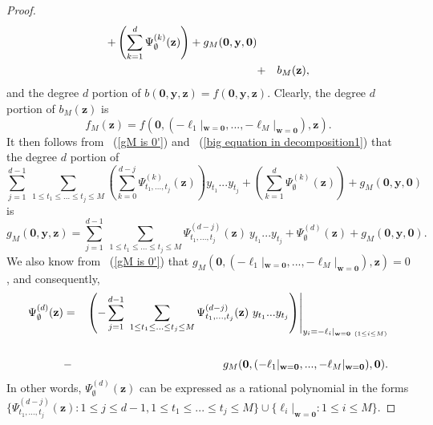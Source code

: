 \documentclass[12pt]{amsart}
\theoremstyle{definition}
\theoremstyle{remark}
\numberwithin{equation}{section}
\begin{document}
\begin{proof}
\begin{eqnarray}
+ \left( \sum_{k=1}^{d} \Psi^{(k)}_{\emptyset} ( \mathbf{z} ) \right) + g_M( \mathbf{0}, \mathbf{y}, \mathbf{0} )
\notag
\\
&+& b_M(\mathbf{z}),
\notag
\end{eqnarray}
and the degree $d$ portion of $b( \mathbf{0}, \mathbf{y}, \mathbf{z}) = f( \mathbf{0}, \mathbf{y}, \mathbf{z})$.
Clearly, the degree $d$ portion of $b_M(\mathbf{z})$ is
$$
f_M(\mathbf{z}) = {f} (\mathbf{0}, (- \ell_1 |_{\mathbf{w} = \mathbf{0}}, ..., -\ell_M |_{\mathbf{w} = \mathbf{0}}),  \mathbf{z}).
$$
It then follows from ~(\ref{gM is 0'}) and ~(\ref{big equation in decomposition1}) that the degree $d$ portion of
$$
\sum_{j=1}^{d-1} \ \sum_{1 \leq t_1 \leq ... \leq t_{j} \leq M}
\left( \sum_{k=0}^{d-j} \Psi^{(k)}_{t_1, ..., t_{j}} ( \mathbf{z} )  \right) y_{t_1} ... y_{t_{j}}
+ \left( \sum_{k=1}^{d} \Psi^{(k)}_{\emptyset} ( \mathbf{z} ) \right)
+ g_M( \mathbf{0}, \mathbf{y}, \mathbf{0} )
$$
is
$$
g_M( \mathbf{0}, \mathbf{y}, \mathbf{z} ) =  \sum_{j=1}^{d-1} \ \sum_{1 \leq t_1 \leq ... \leq t_{j} \leq M}
 \Psi^{(d-j)}_{t_1, ..., t_{j}} ( \mathbf{z} ) \ y_{t_1} ... y_{t_{j}}
+ \Psi^{(d)}_{\emptyset} ( \mathbf{z} )
+ g_M( \mathbf{0}, \mathbf{y}, \mathbf{0} ).
$$
We also know from ~(\ref{gM is 0'}) that $g_M( \mathbf{0}, (- \ell_1 |_{\mathbf{w} = \mathbf{0}}, ..., -\ell_M |_{\mathbf{w} = \mathbf{0}}), \mathbf{z} ) = 0$,
and consequently,
\begin{eqnarray}
\Psi^{(d)}_{\emptyset} ( \mathbf{z} )
&=&
 \left. \left( -\sum_{j=1}^{d-1} \ \sum_{1 \leq t_1 \leq ... \leq t_{j} \leq M} \Psi^{(d-j)}_{t_1, ..., t_{j}} ( \mathbf{z} ) \ y_{t_1} ... y_{t_{j}}
\right) \right|_{y_i = - \ell_i |_{\mathbf{w} = \mathbf{0} \ (1 \leq i \leq M)} }
\notag
\\
&&
\notag
\\
&-& g_M( \mathbf{0}, (- \ell_1 |_{\mathbf{w} = \mathbf{0}}, ..., -\ell_M |_{\mathbf{w} = \mathbf{0}}), \mathbf{0} ).
\notag
\end{eqnarray}
In other words, $\Psi^{(d)}_{\emptyset} ( \mathbf{z} ) $ can be expressed as a rational polynomial
in the forms $ \{ \Psi^{(d-j)}_{t_1, ..., t_{j}} ( \mathbf{z} ) :  1 \leq j \leq d-1, 1 \leq t_1 \leq ... \leq t_{j} \leq M \} \cup \{ \ell_i |_{\mathbf{w} = \mathbf{0}} : 1 \leq i \leq M \}$.


\end{proof}
\end{document}

